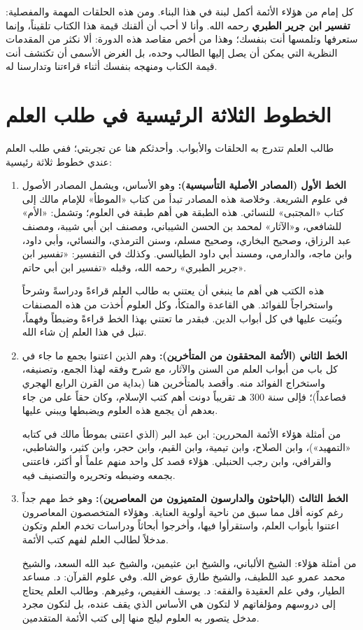 كل إمام من هؤلاء الأئمة أكمل لبنة في هذا البناء. ومن هذه الحلقات المهمة والمفصلية: \textbf{تفسير ابن جرير الطبري} رحمه الله. وأنا لا أحب أن ألقنك قيمة هذا الكتاب تلقيناً، وإنما ستعرفها وتلمسها أنت بنفسك؛ وهذا من أخص مقاصد هذه الدورة: ألا نكثر من المقدمات النظرية التي يمكن أن يصل إليها الطالب وحده، بل الغرض الأسمى أن تكتشف أنت قيمة الكتاب ومنهجه بنفسك أثناء قراءتنا وتدارسنا له.

\section*{الخطوط الثلاثة الرئيسية في طلب العلم}
طالب العلم تتدرج به الحلقات والأبواب. وأحدثكم هنا عن تجربتي؛ ففي طلب العلم عندي خطوط ثلاثة رئيسية:

\begin{enumerate}
    \item \textbf{الخط الأول (المصادر الأصلية التأسيسية):} وهو الأساس، ويشمل المصادر الأصول في علوم الشريعة. وخلاصة هذه المصادر تبدأ من كتاب «الموطأ» للإمام مالك إلى كتاب «المجتبى» للنسائي. هذه الطبقة هي أهم طبقة في العلوم؛ وتشمل: «الأم» للشافعي، و«الآثار» لمحمد بن الحسن الشيباني، ومصنف ابن أبي شيبة، ومصنف عبد الرزاق، وصحيح البخاري، وصحيح مسلم، وسنن الترمذي، والنسائي، وأبي داود، وابن ماجه، والدارمي، ومسند أبي داود الطيالسي. وكذلك في التفسير: «تفسير ابن جرير الطبري» رحمه الله، وقبله «تفسير ابن أبي حاتم».
    
    هذه الكتب هي أهم ما ينبغي أن يعتني به طالب العلم قراءةً ودراسةً وشرحاً واستخراجاً للفوائد. هي القاعدة والمتكأ، وكل العلوم أُخذت من هذه المصنفات وبُنيت عليها في كل أبواب الدين. فبقدر ما تعتني بهذا الخط قراءةً وضبطاً وفهماً، تنبل في هذا العلم إن شاء الله.

    \item \textbf{الخط الثاني (الأئمة المحققون من المتأخرين):} وهم الذين اعتنوا بجمع ما جاء في كل باب من أبواب العلم من السنن والآثار، مع شرح وفقه لهذا الجمع، وتصنيفه، واستخراج الفوائد منه. وأقصد بالمتأخرين هنا (بداية من القرن الرابع الهجري فصاعداً)؛ فإلى سنة 300 هـ تقريباً دونت أهم كتب الإسلام، وكان حقاً على من جاء بعدهم أن يجمع هذه العلوم ويضبطها ويبني عليها.
    
    من أمثلة هؤلاء الأئمة المحررين: ابن عبد البر (الذي اعتنى بموطأ مالك في كتابه «التمهيد»)، وابن الصلاح، وابن تيمية، وابن القيم، وابن حجر، وابن كثير، والشاطبي، والقرافي، وابن رجب الحنبلي. هؤلاء قصد كل واحد منهم علماً أو أكثر، فاعتنى بجمعه وضبطه وتحريره والتصنيف فيه.

    \item \textbf{الخط الثالث (الباحثون والدارسون المتميزون من المعاصرين):} وهو خط مهم جداً رغم كونه أقل مما سبق من ناحية أولوية العناية. وهؤلاء المتخصصون المعاصرون اعتنوا بأبواب العلم، واستقرأوا فيها، وأخرجوا أبحاثاً ودراسات تخدم العلم وتكون مدخلاً لطالب العلم لفهم كتب الأئمة.
    
    من أمثلة هؤلاء: الشيخ الألباني، والشيخ ابن عثيمين، والشيخ عبد الله السعد، والشيخ محمد عمرو عبد اللطيف، والشيخ طارق عوض الله. وفي علوم القرآن: د. مساعد الطيار، وفي علم العقيدة والفقه: د. يوسف الغفيص، وغيرهم. وطالب العلم يحتاج إلى دروسهم ومؤلفاتهم لا لتكون هي الأساس الذي يقف عنده، بل لتكون مجرد مدخل يتصور به العلوم ليلج منها إلى كتب الأئمة المتقدمين.
\end{enumerate}

